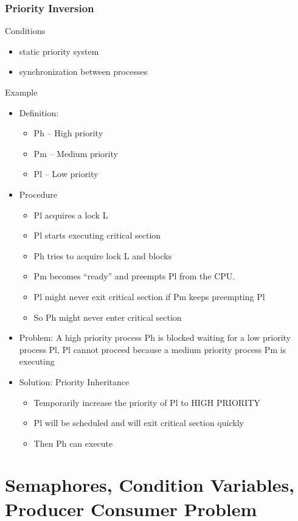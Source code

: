 \documentclass[12pt]{article}
\begin{document}
\subsubsection{Priority Inversion}
Conditions
\begin{itemize}
    \item static priority system
    \item synchronization between processes
\end{itemize}
Example
\begin{itemize}
    \item Definition: \begin{itemize}
        \item Ph – High priority 
        \item Pm – Medium priority 
        \item Pl – Low priority
    \end{itemize}
    \item Procedure \begin{itemize}
        \item Pl acquires a lock L 
        \item Pl starts executing critical section 
        \item Ph tries to acquire lock L and blocks 
        \item Pm becomes “ready” and preempts Pl from the CPU. 
        \item Pl might never exit critical section if Pm keeps preempting Pl
        \item So Ph might never enter critical section
    \end{itemize}
    \item Problem: A high priority process Ph is blocked waiting for a low priority process Pl, Pl cannot proceed because a medium priority process Pm is executing
    \item Solution: Priority Inheritance \begin{itemize}
        \item Temporarily increase the priority of Pl to HIGH PRIORITY 
        \item Pl will be scheduled and will exit critical section quickly 
        \item Then Ph can execute
    \end{itemize}
\end{itemize}

\section{Semaphores, Condition Variables, Producer Consumer Problem}
\end{document}
